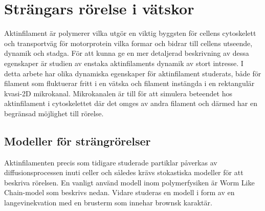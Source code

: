 \chapter{Strängars rörelse i vätskor}

Aktinfilament är polymerer vilka utgör en viktig byggsten för cellens cytoskelett och transportväg för motorprotein vilka formar och bidrar till cellens utseende, dynamik och stadga. För att kunna ge en mer detaljerad beskrivning av dessa egenskaper är studien av enstaka aktinfilaments dynamik av stort intresse. I detta arbete har olika dynamiska egenskaper för aktinfilament studerats, både för filament som fluktuerar fritt i en vätska och filament instängda i en rektangulär kvasi-2D mikrokanal. Mikrokanalen är till för att simulera beteendet hos aktinfilament i cytoskelettet där det omges av andra filament och därmed har en begränsad möjlighet till rörelse.

\section{}


\section{Modeller för strängrörelser}
Aktinfilamenten precis som tidigare studerade partiklar påverkas av diffusionsprocessen inuti celler och således krävs stokastiska modeller för att beskriva rörelsen. En vanligt använd modell inom polymerfysiken är Worm Like Chain-model som beskrivs nedan. Vidare studeras en modell i form av en langevinekvation med en brusterm som innehar brownsk karaktär.

